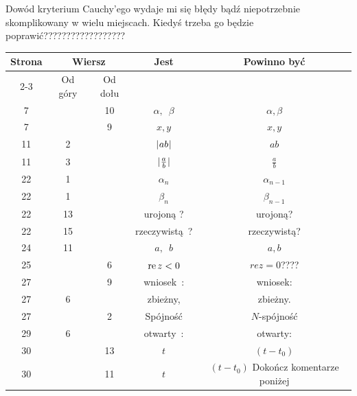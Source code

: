 \documentclass[a4paper,11pt]{article}
\numberwithin{equation}{section}
\begin{document}
\VerSpaceFour





\noindent
{} Dowód kryterium Cauchy'ego wydaje mi się błędy bądź niepotrzebnie
skomplikowany w wielu miejscach. Kiedyś trzeba go będzie
poprawić??????????????????

\VerSpaceFour










\newpage


\begin{center}

  \begin{tabular}{|c|c|c|c|c|}
    \hline
    Strona & \multicolumn{2}{c|}{Wiersz} & Jest
                              & Powinno być \\ \cline{2-3}
    & Od góry & Od dołu & & \\
    \hline
    \hphantom{0}7 & & 10 & $\alpha,\:\; \beta$ & $\alpha, \beta$ \\
    \hphantom{0}7 & & \hphantom{0}9 & $x,\! y$ & $x, y$ \\
    11 & \hphantom{0}2 & & $| \hspace{0.05em}  a b  \hspace{0.05em} |$ & $ab$ \\
    11 & \hphantom{0}3 & & $| \hspace{0.05em}  \tfrac{ a }{ b }  \hspace{0.05em} |$
    & $\tfrac{ a }{ b }$ \\
    22 & \hphantom{0}1 & & $\alpha_{ n }$ & $\alpha_{ n - 1 }$ \\
    22 & \hphantom{0}1 & & $\beta_{ n }$ & $\beta_{ n - 1 }$ \\
    22 & 13 & & urojoną ? & urojoną? \\
    22 & 15 & & rzeczywistą~? & rzeczywistą? \\
    24 & 11 & & $a, \:\; b$ & $a, b$ \\
    25 & & \hphantom{0}6 & $\operatorname{re} z < 0$
    & $re z = 0$???? \\
    27 & & \hphantom{0}9 & wniosek~: & wniosek: \\
    27 & \hphantom{0}6 & & zbieżny, & zbieżny. \\
    27 & & \hphantom{0}2 & Spójność & $N$-spójność \\
    29 & \hphantom{0}6 & & otwarty~: & otwarty: \\
    30 & & 13 & $t$ & $( t - t_{ 0 } )$ \\
    30 & & 11 & $t$ & $( t - t_{ 0 } )$ Dokończ komentarze poniżej \\

\end{tabular}
\end{center}
\end{document}
